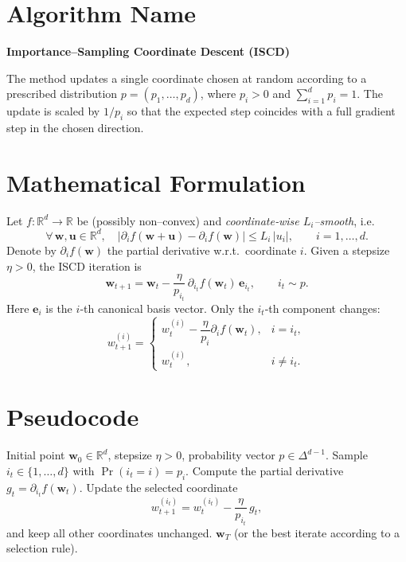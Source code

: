 \documentclass[11pt]{article}
\newcommand{\RR}{\mathbb{R}}
\begin{document}
\section*{Algorithm Name}
\textbf{Importance–Sampling Coordinate Descent (ISCD)}  

The method updates a single coordinate chosen at random according to a prescribed
distribution $p=(p_1,\dots ,p_d)$, where $p_i>0$ and $\sum_{i=1}^d p_i =1$.
The update is scaled by $1/p_i$ so that the expected step coincides with a full
gradient step in the chosen direction.

\section*{Mathematical Formulation}
Let $f:\RR^d\to\RR$ be (possibly non–convex) and \emph{coordinate‑wise $L_i$–smooth}, i.e.
\begin{equation}
\label{eq:smooth}
\forall \, \mathbf{w},\mathbf{u}\in\RR^d,\quad 
\bigl| \partial_i f(\mathbf{w}+\mathbf{u})-\partial_i f(\mathbf{w})\bigr|
\le L_i\,|u_i| ,\qquad i=1,\dots ,d .
\end{equation}
Denote by $\partial_i f(\mathbf{w})$ the partial derivative w.r.t.\ coordinate $i$.
Given a stepsize $\eta>0$, the ISCD iteration is
\begin{equation}
\label{eq:update}
\boxed{
\mathbf{w}_{t+1}= \mathbf{w}_{t}
- \frac{\eta}{p_{i_t}}\,\partial_{i_t}f(\mathbf{w}_{t})\,\mathbf{e}_{i_t}},
\qquad i_t\sim p .
\end{equation}
Here $\mathbf{e}_i$ is the $i$‑th canonical basis vector.  
Only the $i_t$‑th component changes:
\[
w_{t+1}^{(i)}=
\begin{cases}
w_{t}^{(i)}-\dfrac{\eta}{p_{i}}\partial_i f(\mathbf{w}_{t}), & i=i_t,\\[1.2ex]
w_{t}^{(i)}, & i\neq i_t .
\end{cases}
\]

\section*{Pseudocode}
\begin{algorithm}[H]
\caption{Importance–Sampling Coordinate Descent}
\begin{algorithmic}[1]
\REQUIRE Initial point $\mathbf{w}_0\in\RR^d$, stepsize $\eta>0$, probability vector $p\in\Delta^{d-1}$.
    \STATE Sample $i_t\in\{1,\dots ,d\}$ with $\Pr(i_t=i)=p_i$.
    \STATE Compute the partial derivative $g_{t}= \partial_{i_t} f(\mathbf{w}_t)$.
    \STATE Update the selected coordinate
    \[
    w_{t+1}^{(i_t)} = w_{t}^{(i_t)} - \frac{\eta}{p_{i_t}}\,g_{t},
    \]
    and keep all other coordinates unchanged.
\ENDFOR
\RETURN $\mathbf{w}_T$ (or the best iterate according to a selection rule).
\end{algorithmic}
\end{algorithm}
\end{document}
